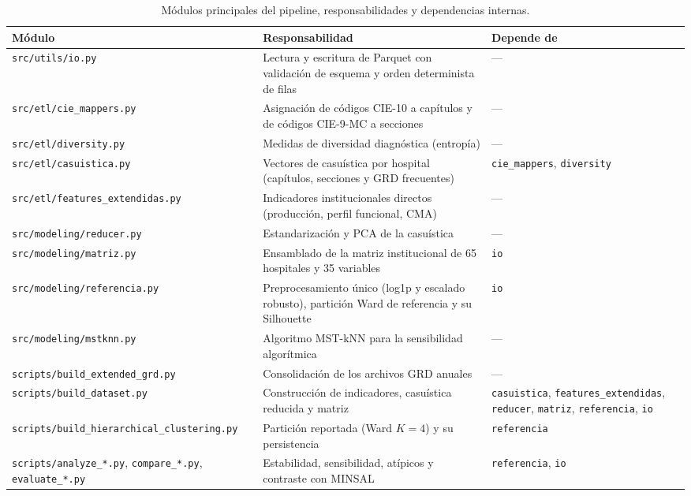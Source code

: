 \begin{table}[htbp]
\centering
\caption{Módulos principales del pipeline, responsabilidades y dependencias internas.}
\label{tab:modulos}
\small
\begin{tabularx}{\textwidth}{>{\raggedright\arraybackslash}p{4.2cm} >{\raggedright\arraybackslash}X >{\raggedright\arraybackslash}p{3.6cm}}
\toprule
\textbf{Módulo} & \textbf{Responsabilidad} & \textbf{Depende de} \\
\midrule
\texttt{src/\allowbreak{}utils/\allowbreak{}io.py} & Lectura y escritura de Parquet con validación de esquema y orden determinista de filas & --- \\
\texttt{src/\allowbreak{}etl/\allowbreak{}cie\_\allowbreak{}mappers.py} & Asignación de códigos CIE-10 a capítulos y de códigos CIE-9-MC a secciones & --- \\
\texttt{src/\allowbreak{}etl/\allowbreak{}diversity.py} & Medidas de diversidad diagnóstica (entropía) & --- \\
\texttt{src/\allowbreak{}etl/\allowbreak{}casuistica.py} & Vectores de casuística por hospital (capítulos, secciones y GRD frecuentes) & \texttt{cie\_\allowbreak{}mappers}, \texttt{diversity} \\
\texttt{src/\allowbreak{}etl/\allowbreak{}features\_\allowbreak{}extendidas.py} & Indicadores institucionales directos (producción, perfil funcional, CMA) & --- \\
\texttt{src/\allowbreak{}modeling/\allowbreak{}reducer.py} & Estandarización y PCA de la casuística & --- \\
\texttt{src/\allowbreak{}modeling/\allowbreak{}matriz.py} & Ensamblado de la matriz institucional de 65 hospitales y 35 variables & \texttt{io} \\
\texttt{src/\allowbreak{}modeling/\allowbreak{}referencia.py} & Preprocesamiento único (log1p y escalado robusto), partición Ward de referencia y su Silhouette & \texttt{io} \\
\texttt{src/\allowbreak{}modeling/\allowbreak{}mstknn.py} & Algoritmo MST-kNN para la sensibilidad algorítmica & --- \\
\midrule
\texttt{scripts/\allowbreak{}build\_\allowbreak{}extended\_\allowbreak{}grd.py} & Consolidación de los archivos GRD anuales & --- \\
\texttt{scripts/\allowbreak{}build\_\allowbreak{}dataset.py} & Construcción de indicadores, casuística reducida y matriz & \texttt{casuistica}, \texttt{features\_\allowbreak{}extendidas}, \texttt{reducer}, \texttt{matriz}, \texttt{referencia}, \texttt{io} \\
\texttt{scripts/\allowbreak{}build\_\allowbreak{}hierarchical\_\allowbreak{}clustering.py} & Partición reportada (Ward $K=4$) y su persistencia & \texttt{referencia} \\
\texttt{scripts/\allowbreak{}analyze\_\allowbreak{}*.py}, \texttt{compare\_\allowbreak{}*.py}, \texttt{evaluate\_\allowbreak{}*.py} & Estabilidad, sensibilidad, atípicos y contraste con MINSAL & \texttt{referencia}, \texttt{io} \\
\bottomrule
\end{tabularx}
\end{table}


